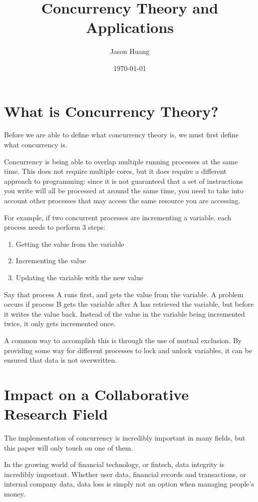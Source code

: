 \documentclass[jou]{apa7}
\title{Concurrency Theory and Applications}
\author{Jason Huang}
\date{\today}
\begin{document}
\maketitle

\section{What is Concurrency Theory?}
Before we are able to define what concurrency theory is,
we must first define what concurrency is.

Concurrency is being able to overlap multiple running processes at the same time.
This does not require multiple cores,
but it does require a different approach to programming:
since it is not guaranteed that a set of instructions you write will all be processed at around the same time,
you need to take into account other processes that may access the same resource you are accessing.

For example, if two concurrent processes are incrementing a variable,
each process needs to perform 3 steps:

\begin{enumerate}
  \item Getting the value from the variable
  \item Incrementing the value
  \item Updating the variable with the new value
\end{enumerate}

Say that process A runs first, and gets the value from the variable.
A problem occurs if process B gets the variable after A has retrieved the variable, but before it writes the value back.
Instead of the value in the variable being incremented twice, it only gets incremented once.

A common way to accomplish this is through the use of mutual exclusion.
By providing some way for different processes to lock and unlock variables,
it can be ensured that data is not overwritten.
\autocite{lamportTuringLectureTheComputer2015}

\section{Impact on a Collaborative Research Field}
The implementation of concurrency is incredibly important in many fields,
but this paper will only touch on one of them.

In the growing world of financial technology, or fintech,
data integrity is incredibly important.
Whether user data, financial records and transactions, or internal company data,
data loss is simply not an option when managing people's money.
\end{document}
